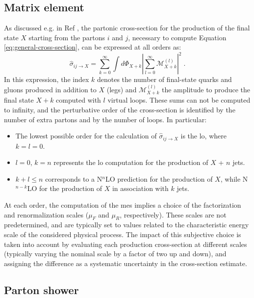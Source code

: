 \subsection{Matrix element}

As discussed e.g. in Ref \cite{Skands:2011pf}, the partonic cross-section for the production of the final state $X$ starting from the partons $i$ and $j$, necessary to compute
Equation \ref{eq:general-cross-section}, can be expressed at all orders as:
\begin{equation}
\hat\sigma_{ij\rightarrow X} = \sum_{k=0}^\infty \int d\Phi_{X+k} | \sum_{l=0}^\infty \mathcal{M}_{X+k}^{(l)}|^2 \; .
\label{eq:xsec_matrix}
\end{equation}
\noindent In this expression, the index $k$ denotes the number of final-state quarks and gluons produced in addition to $X$ (legs) and $\mathcal{M}_{X+k}^{(l)}$
the amplitude to produce the final state $X+k$ computed with $l$ virtual loops. 
These sums can not be computed to infinity, and the perturbative order of the cross-section 
is identified by the number of extra partons and by the number of loops. 
In particular:
\begin{itemize}
\item The lowest possible order for the calculation of $\hat{\sigma}_{ij \rightarrow X}$ is the \gls{lo}, where $k=l=0$.
\item $l=0$, $k=n$ represents the \gls{lo} computation for the production of $X$ + $n$ jets.
\item $k+l \leq n$ corresponds to a N$^n$LO prediction for the production of $X$, while N$^{n-k}$LO for the production of $X$ in association with $k$ jets.
\end{itemize}

At each order, the computation of the \glspl{me} implies a choice of the factorization and renormalization scales 
($\mu_F$ and $\mu_R$, respectively). 
These scales are not predetermined, and are typically set to values related to the characteristic energy scale of the considered physical process. 
The impact of this subjective choice is taken into account by evaluating each production cross-section at different scales (typically varying the nominal scale by a factor of two up and down), and assigning the difference as a systematic uncertainty in the cross-section estimate.


\subsection{Parton shower}


